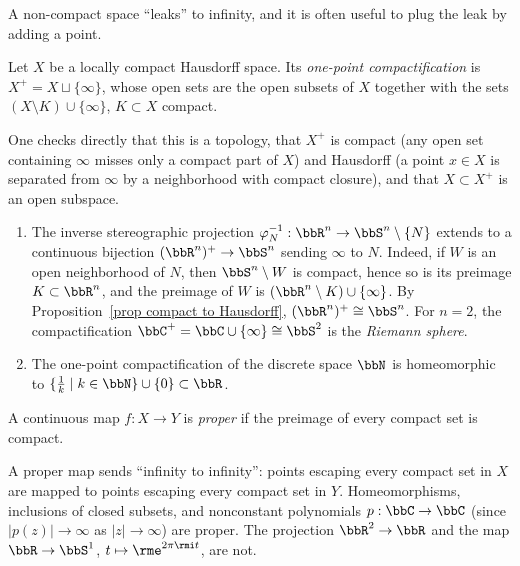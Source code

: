A non-compact space ``leaks'' to infinity, and it is often useful to plug the leak by adding a point.

\begin{defn}
    Let $X$ be a locally compact Hausdorff space. Its \emph{one-point compactification} is $X^+=X\sqcup\{\infty\}$, whose open sets are the open subsets of $X$ together with the sets $(X\setminus K)\cup\{\infty\}$, $K\subset X$ compact.
\end{defn}

One checks directly that this is a topology, that $X^+$ is compact (any open set containing $\infty$ misses only a compact part of $X$) and Hausdorff (a point $x\in X$ is separated from $\infty$ by a neighborhood with compact closure), and that $X\subset X^+$ is an open subspace.

\begin{example}\label{example one point compactification}
    \begin{enumerate}
        \item The inverse stereographic projection $\varphi_N^{-1}:\bbR^n\to\bbS^n\setminus\{N\}$ extends to a continuous bijection $(\bbR^n)^+\to\bbS^n$ sending $\infty$ to $N$. Indeed, if $W$ is an open neighborhood of $N$, then $\bbS^n\setminus W$ is compact, hence so is its preimage $K\subset\bbR^n$, and the preimage of $W$ is $(\bbR^n\setminus K)\cup\{\infty\}$. By Proposition~\ref{prop compact to Hausdorff}, $(\bbR^n)^+\cong\bbS^n$. For $n=2$, the compactification $\bbC^+=\bbC\cup\{\infty\}\cong\bbS^2$ is the \emph{Riemann sphere}.
        \item The one-point compactification of the discrete space $\bbN$ is homeomorphic to $\{\frac1k\mid k\in\bbN\}\cup\{0\}\subset\bbR$.
    \end{enumerate}
\end{example}

\begin{defn}
    A continuous map $f:X\to Y$ is \emph{proper} if the preimage of every compact set is compact.
\end{defn}

A proper map sends ``infinity to infinity'': points escaping every compact set in $X$ are mapped to points escaping every compact set in $Y$. Homeomorphisms, inclusions of closed subsets, and nonconstant polynomials $p:\bbC\to\bbC$ (since $\lvert p(z)\rvert\to\infty$ as $\lvert z\rvert\to\infty$) are proper. The projection $\bbR^2\to\bbR$ and the map $\bbR\to\bbS^1$, $t\mapsto\rme^{2\pi\rmi t}$, are not.

